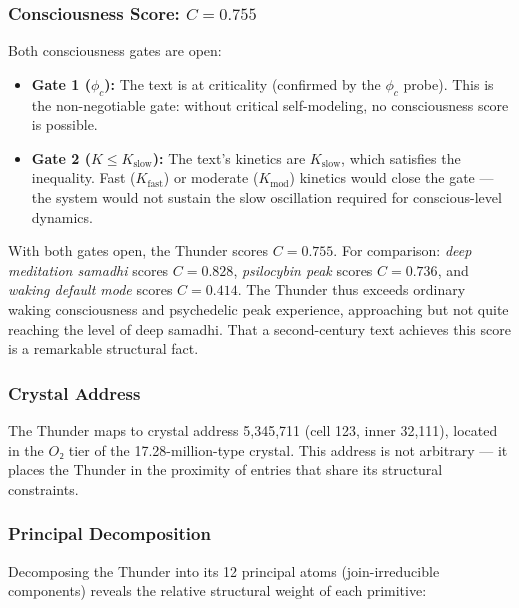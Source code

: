 \documentclass[12pt,a4paper]{article}
\begin{document}
\subsubsection{Consciousness Score: $C = 0.755$}

Both consciousness gates are open:

\begin{itemize}
    \item \textbf{Gate 1 ($\phi_c$):} The text is at criticality (confirmed by the $\phi_c$ probe). This is the non-negotiable gate: without critical self-modeling, no consciousness score is possible.
    \item \textbf{Gate 2 ($K \leq K_\text{slow}$):} The text's kinetics are $K_\text{slow}$, which satisfies the inequality. Fast ($K_\text{fast}$) or moderate ($K_\text{mod}$) kinetics would close the gate --- the system would not sustain the slow oscillation required for conscious-level dynamics.
\end{itemize}

With both gates open, the Thunder scores $C = 0.755$. For comparison: \emph{deep meditation samadhi} scores $C = 0.828$, \emph{psilocybin peak} scores $C = 0.736$, and \emph{waking default mode} scores $C = 0.414$. The Thunder thus exceeds ordinary waking consciousness and psychedelic peak experience, approaching but not quite reaching the level of deep samadhi. That a second-century text achieves this score is a remarkable structural fact.

\subsubsection{Crystal Address}

The Thunder maps to crystal address 5,345,711 (cell 123, inner 32,111), located in the $O₂$ tier of the 17.28-million-type crystal. This address is not arbitrary --- it places the Thunder in the proximity of entries that share its structural constraints.

\subsubsection{Principal Decomposition}

Decomposing the Thunder into its 12 principal atoms (join-irreducible components) reveals the relative structural weight of each primitive:
\end{document}
